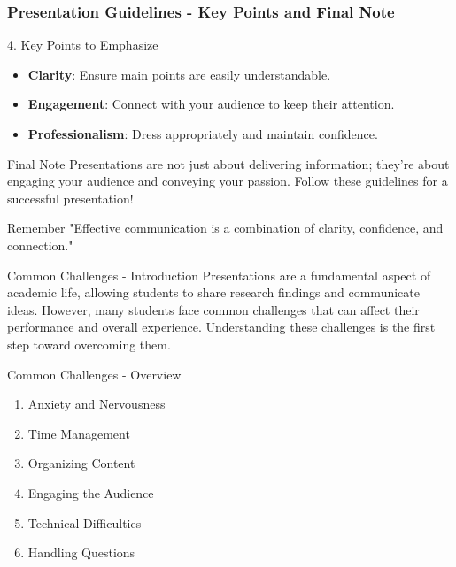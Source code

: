 \documentclass[aspectratio=169]{beamer}
\begin{document}
\begin{frame}[fragile]
    \frametitle{Presentation Guidelines - Key Points and Final Note}
    \begin{block}{4. Key Points to Emphasize}
        \begin{itemize}
            \item \textbf{Clarity}: Ensure main points are easily understandable.
            \item \textbf{Engagement}: Connect with your audience to keep their attention.
            \item \textbf{Professionalism}: Dress appropriately and maintain confidence.
        \end{itemize}
    \end{block}

    \begin{block}{Final Note}
        Presentations are not just about delivering information; they're about engaging your audience and conveying your passion. Follow these guidelines for a successful presentation!
    \end{block}

    \begin{block}{Remember}
        "Effective communication is a combination of clarity, confidence, and connection."
    \end{block}
\end{frame}

\begin{frame}[fragile]{Common Challenges - Introduction}
    Presentations are a fundamental aspect of academic life, allowing students to share research findings and communicate ideas. However, many students face common challenges that can affect their performance and overall experience. Understanding these challenges is the first step toward overcoming them.
\end{frame}

\begin{frame}[fragile]{Common Challenges - Overview}
    \begin{enumerate}
        \item Anxiety and Nervousness
        \item Time Management
        \item Organizing Content
        \item Engaging the Audience
        \item Technical Difficulties
        \item Handling Questions
    \end{enumerate}
\end{frame}
\end{document}

